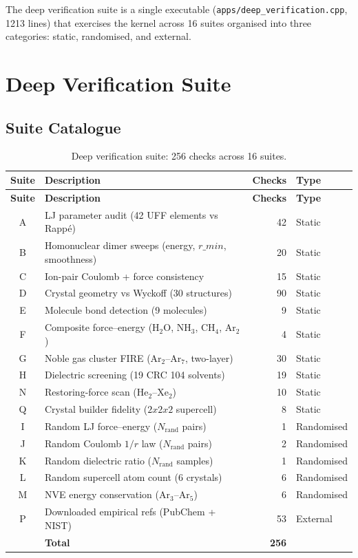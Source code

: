 \documentclass[11pt,twoside]{article}
\def\times{x}%
\def\rmin{r\_min}%
\newcommand{\rmin}{r_{\mathrm{min}}}
\newcommand{\file}[1]{\texttt{#1}}
\begin{document}
The deep verification suite is a single executable (\file{apps/deep\_verification.cpp}, 1213 lines) that exercises the kernel across 16 suites organised into three categories: static, randomised, and external.


\section{Deep Verification Suite}
\label{sec:deep}

\subsection{Suite Catalogue}

\begin{longtable}{clrl}
\caption{Deep verification suite: 256 checks across 16 suites.} \label{tab:suites} \\
\toprule
\textbf{Suite} & \textbf{Description} & \textbf{Checks} & \textbf{Type} \\
\midrule
\endfirsthead
\toprule
\textbf{Suite} & \textbf{Description} & \textbf{Checks} & \textbf{Type} \\
\midrule
\endhead
A & LJ parameter audit (42 UFF elements vs Rapp\'{e}) & 42 & Static \\
B & Homonuclear dimer sweeps (energy, $\rmin$, smoothness) & 20 & Static \\
C & Ion-pair Coulomb + force consistency & 15 & Static \\
D & Crystal geometry vs Wyckoff (30 structures) & 90 & Static \\
E & Molecule bond detection (9 molecules) & 9 & Static \\
F & Composite force--energy (H$_2$O, NH$_3$, CH$_4$, Ar$_2$) & 4 & Static \\
G & Noble gas cluster FIRE (Ar$_2$--Ar$_7$, two-layer) & 30 & Static \\
H & Dielectric screening (19 CRC 104 solvents) & 19 & Static \\
N & Restoring-force scan (He$_2$--Xe$_2$) & 10 & Static \\
Q & Crystal builder fidelity ($2\times2\times2$ supercell) & 8 & Static \\
\midrule
I & Random LJ force--energy ($N_{\mathrm{rand}}$ pairs) & 1 & Randomised \\
J & Random Coulomb $1/r$ law ($N_{\mathrm{rand}}$ pairs) & 2 & Randomised \\
K & Random dielectric ratio ($N_{\mathrm{rand}}$ samples) & 1 & Randomised \\
L & Random supercell atom count (6 crystals) & 6 & Randomised \\
M & NVE energy conservation (Ar$_3$--Ar$_5$) & 6 & Randomised \\
\midrule
P & Downloaded empirical refs (PubChem + NIST) & 53 & External \\
\midrule
  & \textbf{Total} & \textbf{256} & \\
\bottomrule
\end{longtable}
\end{document}
